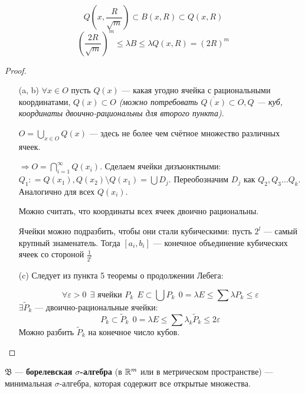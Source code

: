 \begin{enumerate}
\begin{remark}
              \[Q\left(x, \frac{R}{\sqrt{m}}\right) \subset B(x, R) \subset Q(x, R)\]
              \[\left( \frac{2R}{\sqrt{m}} \right)^m \leq \lambda B \leq \lambda Q(x, R) = (2R)^m\]
          \end{remark}
          \begin{proof}\itemfix
              \begin{enumerate}
                  \item [(a, b)] \(\forall x\in O\) пусть \(Q(x)\) --- какая угодно ячейка с рациональными координатами, \(Q(x)\subset O\) \textit{(можно потребовать \(\overline{Q(x)}\subset O, Q\) --- куб, координаты двоично-рациональны для второго пункта)}.

                        \(O = \bigcup\limits_{x\in O} Q(x)\) --- здесь не более чем счётное множество различных ячеек.

                        \(\Rightarrow O = \bigcap_{i = 1}^{\infty} Q(x_i)\). Сделаем ячейки дизъюнктными: \(Q_1 : = Q(x_1), Q(x_2)\setminus Q(x_1) = \bigcup D_j\). Переобозначим \(D_j\) как \(Q_2, Q_3 \dots Q_k\). Аналогично для всех \(Q(x_i)\).

                        Можно считать, что координаты всех ячеек двоично рациональны.

                        Ячейки можно подразбить, чтобы они стали кубическими: пусть \(2^l\) --- самый крупный знаменатель. Тогда \([a_i, b_i]\) --- конечное объединение кубических ячеек со стороной \(\frac{1}{2^l}\)
                  \item [(c)] Следует из пункта 5 теоремы о продолжении Лебега:

                        \[\forall \varepsilon > 0 \ \ \exists \text{ ячейки } P_k \ \ E\subset \bigcup P_k \ \ 0 = \lambda E \le \sum \lambda P_k \leq \varepsilon\]
                        \(\exists \tilde P_k\) --- двоично-рациональные ячейки:
                        \[P_k \subset \tilde P_k \ \ 0 = \lambda E \le \sum \lambda_k \tilde P_k \le 2 \varepsilon\]
                        Можно разбить \(\tilde P_k\) на конечное число кубов.
              \end{enumerate}
          \end{proof}

          \begin{definition}
              \(\mathfrak{B}\) --- \textbf{борелевская \(\sigma\)-алгебра} (в \(\mathbb{R}^m\) или в метрическом пространстве) --- минимальная \(\sigma\)-алгебра, которая содержит все открытые множества.


\end{definition}
\end{enumerate}
